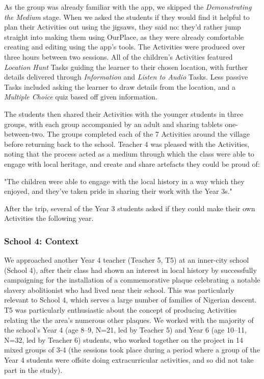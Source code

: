 As the group was already familiar with the app, we skipped the \textit{Demonstrating the Medium} stage. When we asked the students if they would find it helpful to plan their Activities out using the jigsaws, they said no: they'd rather jump straight into making them using OurPlace, as they were already comfortable creating and editing using the app's tools. The Activities were produced over three hours between two sessions. All of the children's Activities featured \textit{Location Hunt} Tasks guiding the learner to their chosen location, with further details delivered through \textit{Information} and \textit{Listen to Audio} Tasks. Less passive Tasks included asking the learner to draw details from the location, and a \textit{Multiple Choice} quiz based off given information. 

The students then shared their Activities with the younger students in three groups, with each group accompanied by an adult and sharing tablets one-between-two. The groups completed each of the 7 Activities around the village before returning back to the school. Teacher 4 was pleased with the Activities, noting that the process acted as a medium through which the class were able to engage with local heritage, and create and share artefacts they could be proud of:

\begin{displayquote}
"The children were able to engage with the local history in a way which they enjoyed, and they've taken pride in sharing their work with the Year 3s."
\end{displayquote}

After the trip, several of the Year 3 students asked if they could make their own Activities the following year.

\subsubsection{School 4: Context}
We approached another Year 4 teacher (Teacher 5, T5) at an inner-city school (School 4), after their class had shown an interest in local history by successfully campaigning for the installation of a commemorative plaque celebrating a notable slavery abolitionist who had lived near their school. This was particularly relevant to School 4, which serves a large number of families of Nigerian descent. T5 was particularly enthusiastic about the concept of producing Activities relating the the area's numerous other plaques. We worked with the majority of the school's Year 4 (age 8--9, N=21, led by Teacher 5) and Year 6 (age 10--11, N=32, led by Teacher 6) students, who worked together on the project in 14 mixed groups of 3-4 (the sessions took place during a period where a group of the Year 4 students were offsite doing extracurricular activities, and so did not take part in the study). 

